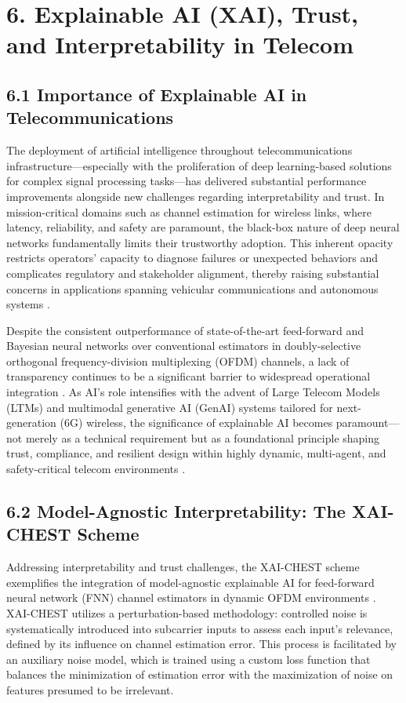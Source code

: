 \documentclass[11pt]{article}
\begin{document}
\section{6. Explainable AI (XAI), Trust, and Interpretability in Telecom}

\subsection{6.1 Importance of Explainable AI in Telecommunications}

The deployment of artificial intelligence throughout telecommunications infrastructure—especially with the proliferation of deep learning-based solutions for complex signal processing tasks—has delivered substantial performance improvements alongside new challenges regarding interpretability and trust. In mission-critical domains such as channel estimation for wireless links, where latency, reliability, and safety are paramount, the black-box nature of deep neural networks fundamentally limits their trustworthy adoption. This inherent opacity restricts operators' capacity to diagnose failures or unexpected behaviors and complicates regulatory and stakeholder alignment, thereby raising substantial concerns in applications spanning vehicular communications and autonomous systems \cite{ref38}\cite{ref41}.

Despite the consistent outperformance of state-of-the-art feed-forward and Bayesian neural networks over conventional estimators in doubly-selective orthogonal frequency-division multiplexing (OFDM) channels, a lack of transparency continues to be a significant barrier to widespread operational integration \cite{ref38}. As AI's role intensifies with the advent of Large Telecom Models (LTMs) and multimodal generative AI (GenAI) systems tailored for next-generation (6G) wireless, the significance of explainable AI becomes paramount—not merely as a technical requirement but as a foundational principle shaping trust, compliance, and resilient design within highly dynamic, multi-agent, and safety-critical telecom environments \cite{ref41}.

\subsection{6.2 Model-Agnostic Interpretability: The XAI-CHEST Scheme}

Addressing interpretability and trust challenges, the XAI-CHEST scheme exemplifies the integration of model-agnostic explainable AI for feed-forward neural network (FNN) channel estimators in dynamic OFDM environments \cite{ref38}\cite{ref41}. XAI-CHEST utilizes a perturbation-based methodology: controlled noise is systematically introduced into subcarrier inputs to assess each input’s relevance, defined by its influence on channel estimation error. This process is facilitated by an auxiliary noise model, which is trained using a custom loss function that balances the minimization of estimation error with the maximization of noise on features presumed to be irrelevant. 
\end{document}

